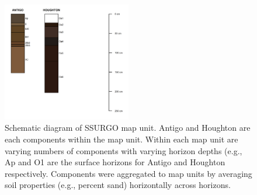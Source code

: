 \begin{figure}[h]
  \centering
    \includegraphics[width=0.5\textwidth]{./img/component_schematic.png}
	\caption[Schematic diagram of SSURGO map unit]{Schematic diagram of SSURGO map unit. Antigo and Houghton are each components within the map unit. Within each map unit are varying numbers of components with varying horizon depths (e.g., Ap and O1 are the surface horizons for Antigo and Houghton respectively. Components were aggregated to map units by averaging soil properties (e.g., percent sand) horizontally across horizons.}
	\label{fig:component_schematic}
\end{figure}
\clearpage
